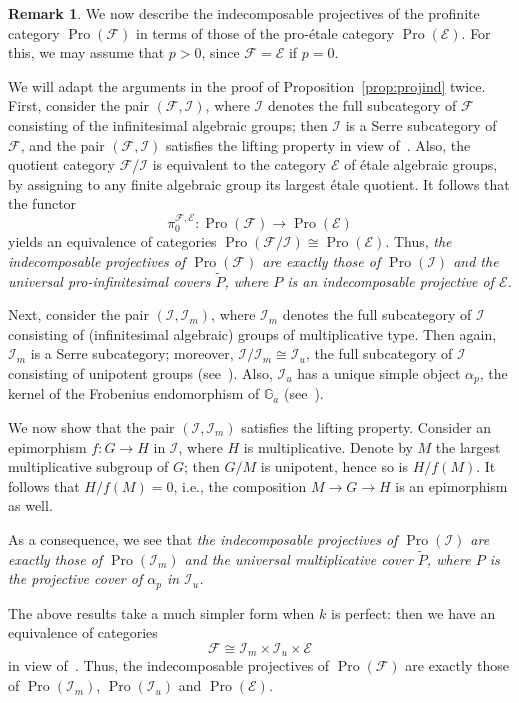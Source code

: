 \documentclass[11pt]{article}
\theoremstyle{definition}
\newtheorem{rema}[theo]{Remark}
\numberwithin{equation}{section}
\newcommand\bG{{\mathbb G}}
\newcommand\cE{{\mathcal E}}
\newcommand\cF{{\mathcal F}}
\newcommand\cI{{\mathcal I}}
\newcommand\tP{{\widetilde P}}
\DeclareMathOperator{\Pro}{Pro}
\theoremstyle{remark}
\begin{document}
\begin{rema}\label{rem:indproj}
We now describe the indecomposable projectives of the profinite category $\Pro(\cF)$ in terms of those of the pro-\'etale category $\Pro(\cE)$. For this, we may assume that $p > 0$, since $\cF = \cE$ if $p = 0$.

We will adapt the arguments in the proof of Proposition~\ref{prop:projind} twice. First, consider the pair $(\cF,\cI)$, where $\cI$ denotes the full subcategory of $\cF$ consisting of the infinitesimal algebraic groups; then $\cI$ is a Serre subcategory of $\cF$, and the pair $(\cF,\cI)$ satisfies the lifting property in view of~\cite[Lem.~2.2]{Br17a}. Also, the quotient category $\cF/\cI$ is equivalent to the category $\cE$ of \'etale algebraic groups, by assigning to any finite algebraic group its largest
\'etale quotient. It follows that the functor
\[
\pi_0^{\cF,\cE} : \Pro(\cF) \longrightarrow \Pro(\cE)
\]
yields an equivalence of categories $\Pro(\cF/\cI) \cong \Pro(\cE)$. Thus,
\emph{the indecomposable projectives of $\Pro(\cF)$ are exactly those of $\Pro(\cI)$ and the universal pro-infinitesimal covers $\tP$, where $P$ is an indecomposable projective of $\cE$.}

Next, consider the pair $(\cI,\cI_m)$, where $\cI_m$ denotes the full subcategory of $\cI$ consisting of (infinitesimal algebraic) groups of multiplicative type. Then again, $\cI_m$ is a Serre subcategory; moreover, $\cI/\cI_m \cong \cI_u$, the full subcategory of $\cI$ consisting of unipotent groups (see~\cite[IV.3.1.1]{DG}). Also, $\cI_u$ has a unique simple object $\alpha_p$, the kernel of the Frobenius endomorphism of $\bG_a$ (see~\cite[IV.2.2.5]{DG}).

We now show that the pair $(\cI,\cI_m)$ satisfies the lifting property. Consider an epimorphism $f : G \to H$ in $\cI$, where $H$ is multiplicative. Denote by $M$ the largest multiplicative subgroup of $G$; then $G/M$ is unipotent, hence so is $H/f(M)$. It follows that $H/f(M) = 0$, i.e., the composition $M \to G \to H$ is an epimorphism as well.

As a consequence, we see that
\emph{the indecomposable projectives of $\Pro(\cI)$ are exactly those of $\Pro(\cI_m)$ and the universal multiplicative cover $\tP$, where $P$ is the projective cover of $\alpha_p$ in $\cI_u$.}

The above results take a much simpler form when $k$ is perfect: then we have an equivalence of categories
\[
\cF \cong \cI_m \times \cI_u \times \cE
\]
in view of~\cite[IV.3.5.9]{DG}. Thus, the indecomposable projectives of $\Pro(\cF)$ are exactly those of $\Pro(\cI_m)$, $\Pro(\cI_u)$ and $\Pro(\cE)$.
\end{rema}
\end{document}
